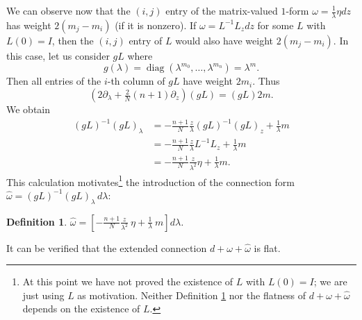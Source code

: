 \documentclass[a4paper,12pt,leqno]{amsart}
\numberwithin{equation}{section}
\theoremstyle{plain}
\newtheorem{definition}[theorem]{Definition}
\theoremstyle{definition}
\newcommand{\la}{\lambda}
\newcommand{\om}{\omega}
\DeclareMathOperator{\diag}{diag}
\renewcommand{\b}{\partial}
\newcommand{\bla}{\b_\la}
\newcommand{\bz}{\b_z}
\newcommand{\nn}{m}
\begin{document}
We can observe now that the $(i,j)$ entry of the matrix-valued $1$-form $\om=\frac1\la\eta dz$ has weight $2(\nn_j-\nn_i)$ (if it is nonzero).  If $\om=L^{-1}L_z dz$ for some $L$ with $L(0)=I$, then the $(i,j)$ entry of $L$ would also have weight $2(\nn_j-\nn_i)$.  In this case, let us consider $gL$ where
\[
g(\la)=
\diag(\la^{\nn_0},\dots,\la^{\nn_n}) = \la^\nn.
\]
Then all entries of the $i$-th column of $gL$ have weight $2\nn_i$.  Thus
\[
(2\bla + \tfrac2N(n+1) \bz) (gL) = (gL) 2\nn.
\]
We obtain
\begin{align*}
(gL)^{-1}(gL)_\la &=  - \tfrac{n+1}N \tfrac z{\la} (gL)^{-1}(gL)_z + \tfrac1\la \nn\\
&= - \tfrac{n+1}N \tfrac z{\la} L^{-1} L_z + \tfrac1\la \nn\\
&=- \tfrac{n+1}N \tfrac z{\la^2} \eta +  \tfrac1\la \nn.
\end{align*}
This calculation motivates\footnote{At this point we have not proved the existence of $L$ with $L(0)=I$; we are just using $L$ as motivation. Neither Definition \ref{hatomega} nor the flatness of
$d+\om+\hat\om$ depends on the existence of $L$.}
 the introduction of the connection form 
$\hat\om=(gL)^{-1} (gL)_\la \,d\la$:

\begin{definition}\label{hatomega}  
$
\hat\om=
\left[
-\tfrac{n+1}N \tfrac{z}{\la^2}
\ \eta
+\tfrac1\la
\ \nn
\right]
d\la
$.
\end{definition}
It can be verified that the extended connection $d+\om+\hat\om$ is flat.  
\end{document}

